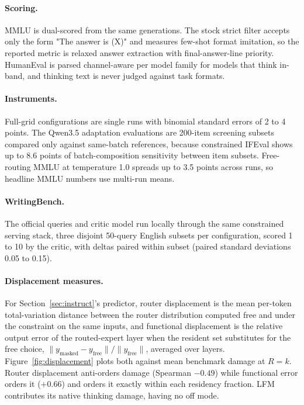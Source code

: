 \documentclass{article}
\begin{document}
\paragraph{Scoring.} MMLU is dual-scored from the same generations. The stock strict
filter accepts only the form "The answer is (X)" and measures few-shot format imitation,
so the reported metric is relaxed answer extraction with final-answer-line priority.
HumanEval is parsed channel-aware per model family for models that think in-band, and
thinking text is never judged against task formats.

\paragraph{Instruments.} Full-grid configurations are single runs with binomial standard errors of 2 to
4 points. The Qwen3.5 adaptation evaluations are 200-item screening subsets compared only against same-batch
references, because constrained IFEval shows up to 8.6 points of batch-composition
sensitivity between item subsets. Free-routing MMLU at temperature 1.0 spreads up to 3.5
points across runs, so headline MMLU numbers use multi-run means.

\paragraph{WritingBench.} The official queries and critic model run locally through the
same constrained serving stack, three disjoint 50-query English subsets per configuration, scored 1
to 10 by the critic, with deltas paired within subset (paired standard deviations 0.05 to
0.15).

\paragraph{Displacement measures.} For Section~\ref{sec:instruct}'s predictor, router
displacement is the mean per-token total-variation distance between the router
distribution computed free and under the constraint on the same inputs, and functional
displacement is the relative output error of the routed-expert layer when the resident set
substitutes for the free choice,
$\lVert y_{\text{masked}}-y_{\text{free}}\rVert/\lVert y_{\text{free}}\rVert$, averaged
over layers. Figure~\ref{fig:displacement} plots both against mean benchmark damage at
$R=k$. Router displacement anti-orders damage (Spearman $-0.49$) while functional error
orders it ($+0.66$) and orders it exactly within each residency fraction. LFM contributes
its native thinking damage, having no off mode.
\end{document}
